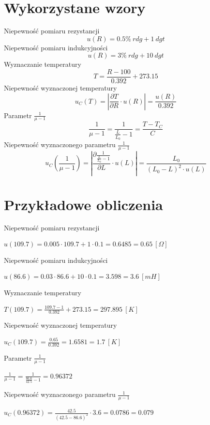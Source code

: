 \documentclass[12pt, a4paper, oneside]{article}
\begin{document}
\section{Wykorzystane wzory}
Niepewność pomiaru rezystancji
\begin{equation}
u(R)=0.5\%~rdg+1~dgt
\end{equation}
Niepewność pomiaru indukcyjności
\begin{equation}
u(R)=3\%~rdg+10~dgt
\end{equation}
Wyznaczanie temperatury
\begin{equation}
T=\frac{R - 100}{0.392}+273.15
\end{equation}
Niepewność wyznaczonej temperatury
\begin{equation}
u_C(T)=|\frac{\partial T}{\partial R}\cdot u(R)|=\frac{u(R)}{0.392}
\end{equation}
Parametr $\frac{1}{\mu-1}$
\begin{equation}
\frac{1}{\mu-1}=\frac{1}{\frac{L}{L_0}-1}=\frac{T-T_C}{C}
\end{equation}
Niepewność wyznaczonego parametru $\frac{1}{\mu-1}$
\begin{equation}
u_C(\frac{1}{\mu-1})=|\frac{\partial \frac{1}{\frac{L}{L_0}-1}}{\partial L}\cdot u(L)|=\frac{L_0}{(L_0-L)^2\cdot u(L)}
\end{equation}
\section{Przykładowe obliczenia}
Niepewność pomiaru rezystancji
\begin{center}
$u(109.7)=0.005\cdot109.7+1\cdot 0.1=0.6485=0.65~[\Omega]$
\end{center}
Niepewność pomiaru indukcyjności
\begin{center}
$u(86.6)=0.03\cdot86.6+10\cdot 0.1=3.598=3.6~[mH]$
\end{center}
Wyznaczanie temperatury
\begin{center}
$T(109.7)=\frac{109.7-1}{0.392}+273.15=297.895~[K]$
\end{center}
Niepewność wyznaczonej temperatury
\begin{center}
$u_C(109.7)=\frac{0.65}{0.392}=1.6581=1.7~[K]$
\end{center}
Parametr $\frac{1}{\mu-1}$
\begin{center}
$\frac{1}{\mu-1}=\frac{1}{\frac{86.6}{42.5}-1}=0.96372$
\end{center}
Niepewność wyznaczonego parametru $\frac{1}{\mu-1}$
\begin{center}
$u_C(0.96372)=\frac{42.5}{(42.5-86.6)^2}\cdot 3.6=0.0786=0.079$
\end{center}
\clearpage
\end{document}
